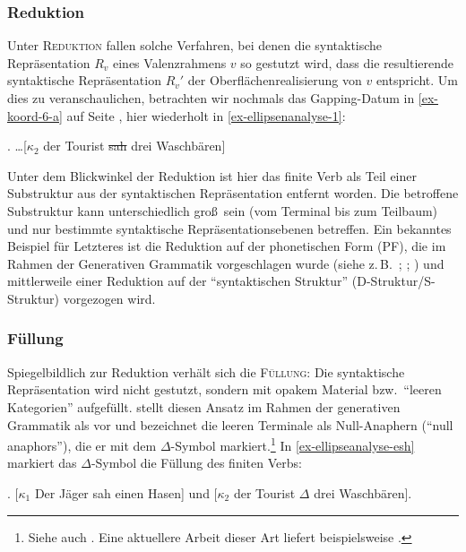 \subsubsection*{Reduktion}

Unter \textsc{Reduktion} fallen solche Verfahren, bei denen die syntaktische Repräsentation $R_v$ eines Valenzrahmens $v$ so gestutzt wird, dass die resultierende syntaktische Repräsentation $R_v'$ der Oberflächenrealisierung von $v$ entspricht. Um dies zu veranschaulichen, betrachten wir nochmals das Gapping-Datum in \ref{ex-koord-6-a} auf Seite \pageref{ex-koord-6-a}, hier wiederholt in \ref{ex-ellipsenanalyse-1}:

\ex.  \label{ex-ellipsenanalyse-1}\ldots [$\kappa_2$ der Tourist \sout{sah} drei Waschbären]

Unter dem Blickwinkel der Reduktion ist hier das finite Verb als Teil einer Substruktur aus der syntaktischen Repräsentation entfernt worden. Die betroffene Substruktur kann unterschiedlich gro\ss\ sein (vom Terminal bis zum Teilbaum) und nur bestimmte syntaktische Repräsentationsebenen betreffen. Ein bekanntes Beispiel für Letzteres ist die Reduktion auf der phonetischen Form (PF), die im Rahmen der Generativen Grammatik vorgeschlagen wurde (siehe z.\,B.\ \citealt{Klein:93}; \citealt{Hartmann:00}; \citealt{Merchant:01}) und mittlerweile einer Reduktion auf der "`syntaktischen Struktur"' (D-Struktur/S-Struktur) vorgezogen wird.

\subsubsection*{Füllung}

Spiegelbildlich zur Reduktion verhält sich die \textsc{Füllung}: Die syntaktische Repräsentation wird nicht gestutzt, sondern mit opakem Material bzw.\ "`leeren Kategorien"' aufgefüllt. \citet[98f]{Wasow:72} stellt diesen Ansatz im Rahmen der generativen Grammatik als  vor und bezeichnet die leeren Terminale als Null-Anaphern ("`null anaphors"'), die er mit dem  $\Delta$-Symbol markiert.\footnote{Siehe auch \cite{Wasow:79}. Eine aktuellere Arbeit dieser Art liefert beispielsweise \cite{Johnson:01}.} In \ref{ex-ellipseanalyse-esh} markiert das $\Delta$-Symbol die Füllung des finiten Verbs:
\largerpage%

\ex. [$\kappa_1$ Der Jäger sah einen Hasen] und [$\kappa_2$ der Tourist $\Delta$ drei Waschbären].\label{ex-ellipseanalyse-esh}

